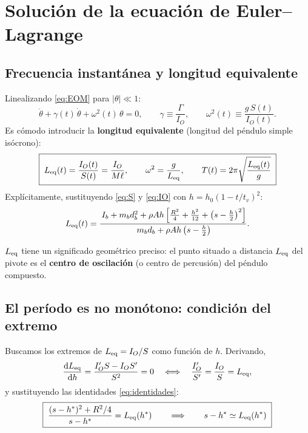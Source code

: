 \documentclass[11pt,a4paper]{article}
\newcommand{\dd}{\mathrm{d}}
\begin{document}
\section{Solución de la ecuación de Euler--Lagrange}
\label{sec:solucion}

\subsection{Frecuencia instantánea y longitud equivalente}

Linealizando \eqref{eq:EOM} para $|\theta|\ll 1$:
\begin{equation}
\ddot\theta + \gamma(t)\,\dot\theta + \omega^2(t)\,\theta = 0,
\qquad
\gamma \equiv \frac{\Gamma}{I_O},\qquad
\omega^2(t) \equiv \frac{g\,S(t)}{I_O(t)} .
\label{eq:lineal}
\end{equation}
Es cómodo introducir la \textbf{longitud equivalente} (longitud del péndulo simple isócrono):
\begin{equation}
\boxed{\;
L_{\rm eq}(t) = \frac{I_O(t)}{S(t)} = \frac{I_O}{M\ell},
\qquad
\omega^2 = \frac{g}{L_{\rm eq}},\qquad
T(t) = 2\pi\sqrt{\frac{L_{\rm eq}(t)}{g}} \;}
\label{eq:Leq}
\end{equation}
Explícitamente, sustituyendo \eqref{eq:S} y \eqref{eq:IO} con $h=h_0(1-t/t_v)^2$:
\begin{equation}
L_{\rm eq}(t) =
\frac{\,I_b + m_b d_b^2 + \rho A h\left[\frac{R^2}{4}+\frac{h^2}{12}+\left(s-\frac h2\right)^2\right]}
     {\,m_b d_b + \rho A h\left(s-\frac h2\right)} .
\label{eq:Leqexp}
\end{equation}

$L_{\rm eq}$ tiene un significado geométrico preciso: el punto situado a distancia $L_{\rm eq}$ del
pivote es el \textbf{centro de oscilación} (o centro de percusión) del péndulo compuesto.

\subsection{El período es no monótono: condición del extremo}
\label{sec:extremo}

Buscamos los extremos de $L_{\rm eq}=I_O/S$ como función de $h$. Derivando,
\begin{equation}
\frac{\dd L_{\rm eq}}{\dd h} = \frac{I_O' S - I_O S'}{S^2} = 0
\quad\Longleftrightarrow\quad
\frac{I_O'}{S'} = \frac{I_O}{S}=L_{\rm eq},
\end{equation}
y sustituyendo las identidades \eqref{eq:identidades}:
\begin{equation}
\boxed{\;
\frac{(s-h^\ast)^2 + R^2/4}{\,s-h^\ast\,} = L_{\rm eq}(h^\ast)
\qquad\Longrightarrow\qquad
s-h^\ast \simeq L_{\rm eq}(h^\ast)\;}
\label{eq:extremo}
\end{equation}
\end{document}
